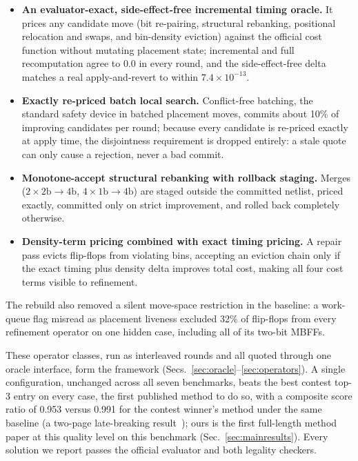 \begin{itemize}
\item \textbf{An evaluator-exact, side-effect-free incremental timing oracle.} It prices any candidate move (bit re-pairing, structural rebanking, positional relocation and swaps, and bin-density eviction) against the official cost function without mutating placement state; incremental and full recomputation agree to $0.0$ in every round, and the side-effect-free delta matches a real apply-and-revert to within $7.4\times10^{-13}$.
\item \textbf{Exactly re-priced batch local search.} Conflict-free batching, the standard safety device in batched placement moves, commits about 10\% of improving candidates per round; because every candidate is re-priced exactly at apply time, the disjointness requirement is dropped entirely: a stale quote can only cause a rejection, never a bad commit.
\item \textbf{Monotone-accept structural rebanking with rollback staging.} Merges ($2{\times}2\mathrm{b}{\to}4\mathrm{b}$, $4{\times}1\mathrm{b}{\to}4\mathrm{b}$) are staged outside the committed netlist, priced exactly, committed only on strict improvement, and rolled back completely otherwise.
\item \textbf{Density-term pricing combined with exact timing pricing.} A repair pass evicts flip-flops from violating bins, accepting an eviction chain only if the exact timing plus density delta improves total cost, making all four cost terms visible to refinement.
\end{itemize}

The rebuild also removed a silent move-space restriction in the baseline: a work-queue flag misread as placement liveness excluded 32\% of flip-flops from every refinement operator on one hidden case, including all of its two-bit MBFFs.

These operator classes, run as interleaved rounds and all quoted through one oracle interface, form the framework (Secs.~\ref{sec:oracle}--\ref{sec:operators}). A single configuration, unchanged across all seven benchmarks, beats the best contest top-3 entry on every case, the first published method to do so, with a composite score ratio of 0.953 versus 0.991 for the contest winner's method under the same baseline (a two-page late-breaking result~\cite{li2025lbr}); ours is the first full-length method paper at this quality level on this benchmark (Sec.~\ref{sec:mainresults}). Every solution we report passes the official evaluator and both legality checkers.

